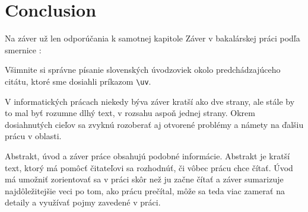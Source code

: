 \chapter*{Conclusion} %

Na záver už len odporúčania k samotnej kapitole Záver v bakalárskej
práci podľa smernice \cite{smernica}:  

Všimnite si správne písanie slovenských úvodzoviek okolo
predchádzajúceho citátu, ktoré sme dosiahli príkazom \verb'\uv'.

V informatických prácach niekedy býva záver kratší ako dve strany, ale
stále by to mal byť rozumne dlhý text, v rozsahu aspoň jednej strany.
Okrem dosiahnutých cieľov sa zvyknú rozoberať aj otvorené problémy a
námety na ďalšiu prácu v oblasti.

Abstrakt, úvod a záver práce obsahujú podobné informácie. Abstrakt je
kratší text, ktorý má pomôcť čitateľovi sa rozhodnúť, či vôbec prácu
chce čítať. Úvod má umožniť zorientovať sa v práci skôr než ju začne
čítať a záver sumarizuje najdôležitejšie veci po tom, ako prácu
prečítal, môže sa teda viac zamerať na detaily a využívať pojmy
zavedené v práci.

